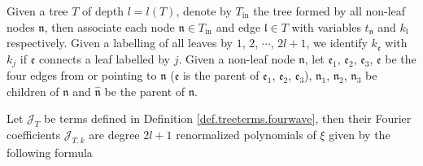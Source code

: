 \begin{lem}\label{lem.treeterms.fourwave} Given a tree $T$ of depth $l=l(T)$, denote by $T_{\text{in}}$ the tree formed by all non-leaf nodes $\mathfrak{n}$, then associate each node $\mathfrak{n}\in T_{\text{in}}$ and edge $\mathfrak{l}\in T$ with variables $t_{\mathfrak{n}}$ and $k_{\mathfrak{l}}$ respectively. Given a labelling of all leaves by $1$, $2$, $\cdots$, $2l+1$, we identify $k_{\mathfrak{e}}$ with $k_j$ if $\mathfrak{e}$ connects a leaf labelled by $j$. Given a non-leaf node $\mathfrak{n}$, let $\mathfrak{e}_1$, $\mathfrak{e}_2$, $\mathfrak{e}_3$, $\mathfrak{e}$ be the four edges from or pointing to $\mathfrak{n}$ ($\mathfrak{e}$ is the parent of $\mathfrak{e}_1$, $\mathfrak{e}_2$, $\mathfrak{e}_3$), $\mathfrak{n}_1$, $\mathfrak{n}_2$, $\mathfrak{n}_3$ be children of $\mathfrak{n}$ and $\hat{\mathfrak{n}}$ be the parent of $\mathfrak{n}$.

Let $\mathcal{J}_T$ be terms defined in Definition \ref{def.treeterms.fourwave}, then their Fourier coefficients $\mathcal{J}_{T,k}$ are degree $2l+1$ renormalized polynomials of $\xi$ given by the following formula


\end{lem}
